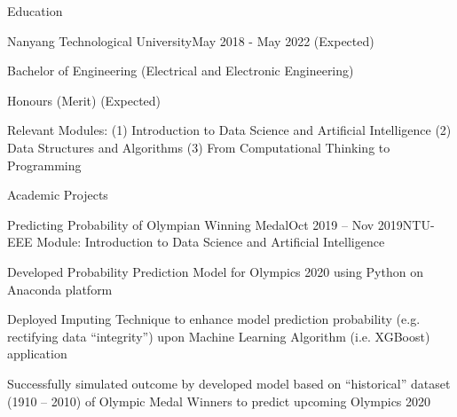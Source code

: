 \documentclass{resume} %
\begin{document}

\begin{rSection}{Education}

\begin{rSubsection}{Nanyang Technological University}{May 2018 - May 2022 (Expected)}{}{}
\item Bachelor of Engineering (Electrical and Electronic Engineering)	
\item Honours (Merit) (Expected) 
\item Relevant Modules: (1) Introduction to Data Science and Artificial Intelligence \newline
(2) Data Structures and Algorithms (3) From Computational Thinking to Programming
\end{rSubsection}

\end{rSection}


\begin{rSection}{Academic Projects}

\begin{rSubsection}{Predicting Probability of Olympian Winning Medal}{Oct 2019 – Nov 2019}{}{NTU-EEE Module: Introduction to Data Science and Artificial Intelligence}
\item Developed Probability Prediction Model for Olympics 2020 using Python on Anaconda platform 
\item Deployed Imputing Technique to enhance model prediction probability (e.g. rectifying data “integrity”) upon Machine Learning Algorithm (i.e. XGBoost) application 
\item Successfully simulated outcome by developed model based on “historical” dataset (1910 – 2010) of Olympic Medal Winners to predict upcoming Olympics 2020 

\end{rSubsection}

\end{rSection}

\end{document}
